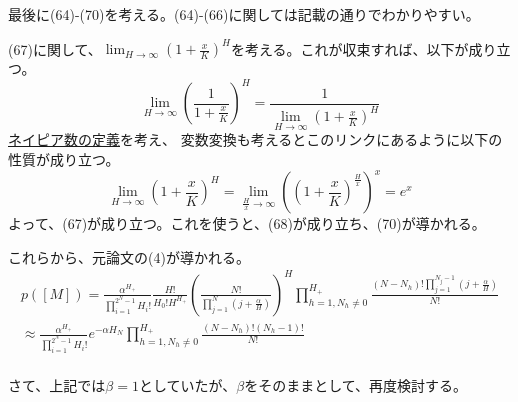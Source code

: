 ﻿\documentclass{jsarticle}
\begin{document}
最後に(64)-(70)を考える。(64)-(66)に関しては記載の通りでわかりやすい。

(67)に関して、$\lim_{H\rightarrow\infty}(1+\frac{x}{K})^H$を考える。これが収束すれば、以下が成り立つ。
\begin{equation}
\lim_{H\rightarrow\infty}(\frac{1}{1+\frac{x}{K}})^H = \frac{1}{\lim_{H\rightarrow\infty}(1+\frac{x}{K})^H}
\end{equation}
\href{https://ja.wikipedia.org/wiki/%E3%83%8D%E3%82%A4%E3%83%94%E3%82%A2%E6%95%B0}{ネイピア数の定義}を考え、
変数変換も考えるとこのリンクにあるように以下の性質が成り立つ。
\begin{equation}
\lim_{H\rightarrow\infty}(1+\frac{x}{K})^H = \lim_{\frac{H}{x}\rightarrow\infty}((1+\frac{x}{K})^\frac{H}{x})^x = e^{x}
\end{equation}
よって、(67)が成り立つ。これを使うと、(68)が成り立ち、(70)が導かれる。

これらから、元論文の(4)が導かれる。
\begin{equation}
\begin{split}
p([M]) = \frac{\alpha^{H_+}}{\prod_{i=1}^{2^N - 1}H_i!} \frac{H!}{H_0!H^{H_+}}(\frac{N!}{\prod_{j = 1}^N (j + \frac{\alpha}{H})})^H \prod_{h=1, N_h \neq 0}^{H_+} \frac{(N - N_h)!\prod_{j=1}^{N_j - 1}(j + \frac{\alpha}{H})}{N!}\\
\approx \frac{\alpha^{H_+}}{\prod_{i=1}^{2^N - 1}H_i!} e^{-\alpha H_N} \prod_{h=1, N_h \neq 0}^{H_+} \frac{(N - N_h)!(N_h - 1)!}{N!}\\
\end{split}
\end{equation}

さて、上記では$\beta = 1$としていたが、$\beta$をそのままとして、再度検討する。
\end{document}
